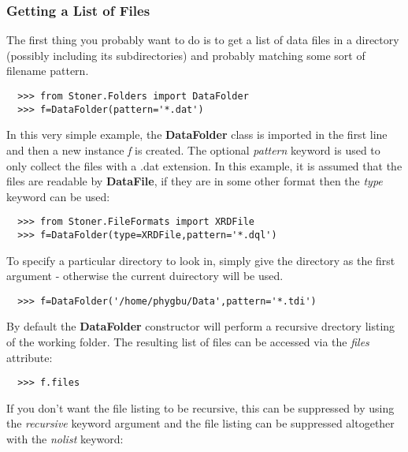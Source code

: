 \documentclass[a4paper,11pt]{scrartcl}
\begin{document}
\subsubsection{Getting a List of Files}

The first thing you probably want to do is to get a list of data files in a directory (possibly including its subdirectories) and probably matching some sort of filename pattern.

\begin{verbatim}
  >>> from Stoner.Folders import DataFolder
  >>> f=DataFolder(pattern='*.dat')
\end{verbatim}

In this very simple example, the \textbf{DataFolder} class is imported in the first line and then a new instance \textit{f} is created. The optional \textit{pattern} keyword is used to only collect the files with a .dat extension. In this example, it is assumed that the files are readable by \textbf{DataFile}, if they are in some other format then the \textit{type} keyword can be used:

\begin{verbatim}
  >>> from Stoner.FileFormats import XRDFile
  >>> f=DataFolder(type=XRDFile,pattern='*.dql')
\end{verbatim}

To specify a particular directory to look in, simply give the directory as the first argument - otherwise the current duirectory will be used.

\begin{verbatim}
  >>> f=DataFolder('/home/phygbu/Data',pattern='*.tdi')
\end{verbatim}

By default the \textbf{DataFolder} constructor will perform a recursive drectory listing of the working folder. The resulting list of files can be accessed via the \textit{files} attribute:

\begin{verbatim}
  >>> f.files
\end{verbatim}


If you don't want the file listing to be recursive, this can be suppressed by using the \textit{recursive} keyword argument and the file listing can be suppressed altogether with the \textit{nolist} keyword:
\end{document}
